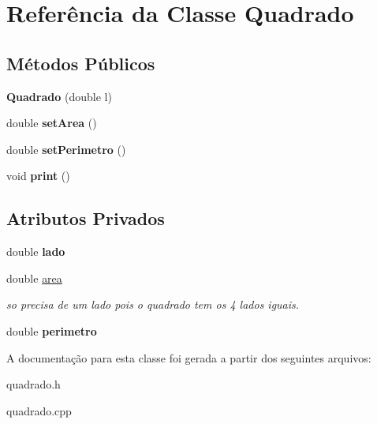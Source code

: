 \hypertarget{classQuadrado}{}\section{Referência da Classe Quadrado}
\label{classQuadrado}
\subsection*{Métodos Públicos}
\begin{DoxyCompactItemize}
\item 
{\bfseries Quadrado} (double l)\hypertarget{classQuadrado_a51efba85553e498ae66c5659f653cf49}{}\label{classQuadrado_a51efba85553e498ae66c5659f653cf49}

\item 
double {\bfseries set\+Area} ()\hypertarget{classQuadrado_a5a36135a76278eac6a372b0b8168aab9}{}\label{classQuadrado_a5a36135a76278eac6a372b0b8168aab9}

\item 
double {\bfseries set\+Perimetro} ()\hypertarget{classQuadrado_a990a59b0a5a2b3d69e585735d9e6629b}{}\label{classQuadrado_a990a59b0a5a2b3d69e585735d9e6629b}

\item 
void {\bfseries print} ()\hypertarget{classQuadrado_a27dac12fb8fddc60dcd33e10604ab3a6}{}\label{classQuadrado_a27dac12fb8fddc60dcd33e10604ab3a6}

\end{DoxyCompactItemize}
\subsection*{Atributos Privados}
\begin{DoxyCompactItemize}
\item 
double {\bfseries lado}\hypertarget{classQuadrado_afc4d3b53aee7150d232b686358b972e7}{}\label{classQuadrado_afc4d3b53aee7150d232b686358b972e7}

\item 
double \hyperlink{classQuadrado_acd82edc222e6630bcb14ad9c09450d70}{area}\hypertarget{classQuadrado_acd82edc222e6630bcb14ad9c09450d70}{}\label{classQuadrado_acd82edc222e6630bcb14ad9c09450d70}

\begin{DoxyCompactList}\small\item\em so precisa de um lado pois o quadrado tem os 4 lados iguais. \end{DoxyCompactList}\item 
double {\bfseries perimetro}\hypertarget{classQuadrado_a50c2afa0974685c1d2d13b468fd43d80}{}\label{classQuadrado_a50c2afa0974685c1d2d13b468fd43d80}

\end{DoxyCompactItemize}


A documentação para esta classe foi gerada a partir dos seguintes arquivos\+:\begin{DoxyCompactItemize}
\item 
quadrado.\+h\item 
quadrado.\+cpp\end{DoxyCompactItemize}
